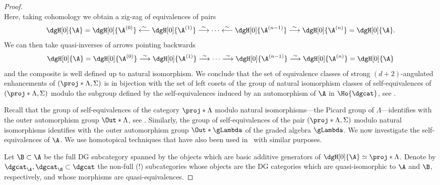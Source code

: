 \documentclass[a4paper]{amsart}
\begin{document}
\begin{proof}
\begin{equation*}
  \end{equation*}
  Here, taking cohomology we obtain a zig-zag of equivalences of pairs
     \begin{equation*}
    \dgH[0]{\A}= \dgH[0]{\A^{(0)}}\stackrel{\sim}{\longleftarrow} \dgH[0]{\A^{(1)}}\stackrel{\sim}{\longrightarrow}\cdots\stackrel{\sim}{\longleftarrow} \dgH[0]{\A^{(n-1)}}\stackrel{\sim}{\longrightarrow} \dgH[0]{\A^{(n)}}= \dgH[0]{\A}.
  \end{equation*}
  We can then take quasi-inverses of arrows pointing backwards
       \begin{equation*}
    \dgH[0]{\A}= \dgH[0]{\A^{(0)}}\stackrel{\sim}{\longrightarrow} \dgH[0]{\A^{(1)}}\stackrel{\sim}{\longrightarrow}\cdots\stackrel{\sim}{\longrightarrow} \dgH[0]{\A^{(n-1)}}\stackrel{\sim}{\longrightarrow} \dgH[0]{\A^{(n)}}= \dgH[0]{\A}
  \end{equation*}
  and the composite is well defined up to natural isomorphism.
  We conclude that the set of equivalence classes of strong $(d+2)$-angulated
  enhancements of $(\proj*{\Lambda},\Sigma)$ is in bijection with the set of left
  cosets of the group of natural isomorphism classes of self-equivalences of
  $(\proj*{\Lambda},\Sigma)$ modulo the subgroup defined by the
  self-equivalences induced by an automorphism of $\A$ in $\Ho{\dgcat}$, see
  .

  Recall that the group of self-equivalences of the category $\proj*{\Lambda}$
  modulo natural isomorphisms---the Picard group of $\Lambda$---identifies with
  the outer automorphism group $\Out*{\Lambda}$, see
  . Similarly, the group of self-equivalences of the
  pair $(\proj*{\Lambda},\Sigma)$ modulo natural isomorphisms identifies with
  the outer automorphism group $\Out*{\gLambda}$ of the graded algebra
  $\gLambda$. We now investigate the self-equivalences of $\A$. We use
  homotopical techniques that have also been used in~\cite[Sec.~8]{Mur22} with
  similar purposes.

  Let $\B\subset\A$ be the full DG subcategory spanned by the objects which are
  basic additive generators of $\dgH[0]{\A}\simeq\proj*{\Lambda}$. Denote by
  $\dgcat_\A,\dgcat_\B\subset\dgcat$ the non-full (!) subcategories whose objects are the DG categories which are quasi-isomorphic to $\A$ and $\B$, respectively, and whose morphisms are quasi-equivalences. 


\end{proof}
\end{document}
